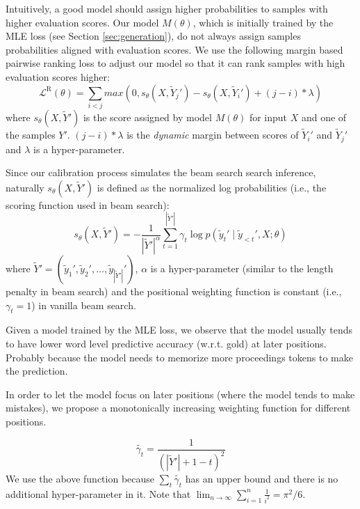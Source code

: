 \documentclass{article}
\begin{document}
Intuitively, a good model should assign higher probabilities to samples with higher evaluation scores. Our model $M(\theta)$, which is initially trained by the MLE loss (see Section \ref{sec:generation}), do not always assign samples probabilities aligned with evaluation scores. We use the following margin based pairwise ranking loss \cite{hopkins2011tuning,zhong-etal-2020-extractive} to adjust our model so that it can rank samples with high evaluation scores higher:
\begin{equation}
    \label{eq:rank}
\mathcal{L}^{\text{R}}(\theta) = \sum_{i < j} max( 0, s_{\theta}(X, \tilde{Y}_j') - s_{\theta}(X, \tilde{Y}_i') + (j-i) * \lambda )
\end{equation}
where $s_{\theta}(X, \tilde{Y}')$ is the  score assigned by model $M(\theta)$ for input $X$ and one of the samples $Y'$. $(j-i) * \lambda$ is the \emph{dynamic} margin between scores of $\tilde{Y}_i'$ and $\tilde{Y}_j'$ and $\lambda$ is a hyper-parameter.


Since our calibration process simulates the beam search search inference, naturally  $s_{\theta}(X, \tilde{Y}')$ is defined as the normalized log probabilities (i.e., the scoring function used in beam search):
\begin{equation}
    \label{eq:onlinescore}
s_{\theta}(X, \tilde{Y}') = - \frac{1}{ {|\tilde{Y}'|}^{\alpha} } \sum_{t=1}^{|\tilde{Y}'|} \gamma_t \log p\left(\tilde{y}_t' \mid \tilde{y}_{<t}', X ; \theta\right)
\end{equation}
where $\tilde{Y}' = (\tilde{y}_1', \tilde{y}_2', \dots, \tilde{y}_{|\tilde{Y}'|}')$, $\alpha$ is a hyper-parameter (similar to the length penalty in beam search) and the positional weighting function is constant (i.e., $\gamma_t=1$) in vanilla beam search.



Given a model trained by the MLE loss, we observe that 
the model usually tends to have lower word level predictive accuracy (w.r.t. gold) at later positions. Probably because the model needs to memorize more proceedings tokens to make the prediction.

In order to let the model focus on later positions (where the model tends to make mistakes), we propose a monotonically increasing weighting function for different positions.

\begin{equation}
    \tilde{\gamma_t} = \frac{1}{ ( |\tilde{Y}'| + 1 - t )^2 }
\end{equation}
We use the above function because $\sum_{t} \tilde{\gamma_t}$ has an upper bound and there is no additional hyper-parameter in it. Note that $\lim_{n\to \infty} \sum_{i=1}^{n} \frac{1}{i^2}=\pi^2/6$.
\end{document}
